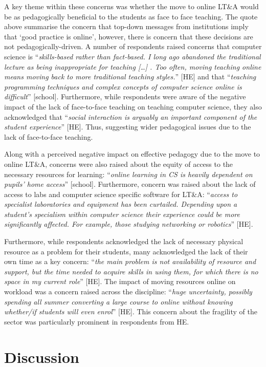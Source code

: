 \documentclass[sigconf]{acmart}
\begin{document}
A key theme within these concerns was whether the move to online LT\&A
would be as pedagogically beneficial to the students as face to face
teaching. The quote above summarise the concern that top-down messages
from institutions imply that `good practice is online', however, there
is concern that these decisions are not pedagogically-driven. A number
of respondents raised concerns that computer science is
``{\emph{skills-based rather than fact-based.  I long ago abandoned
the traditional lecture as being inappropriate for teaching […] .  Too
often, moving teaching online means moving back to more traditional
teaching styles.}}” [HE] and that ``{\emph{teaching programming
techniques and complex concepts of computer science online is
difficult}}'' [school]. Furthermore, while respondents were aware of
the negative impact of the lack of face-to-face teaching on teaching
computer science, they also acknowledged that ``{\emph{social
interaction is arguably an important component of the student
experience}}'' [HE]. Thus, suggesting wider pedagogical issues due to
the lack of face-to-face teaching.

Along with a perceived negative impact on effective pedagogy due to
the move to online LT\&A, concerns were also raised about the equity
of access to the necessary resources for learning: ``{\emph{online learning in
CS is heavily dependent on pupils' home access}}'' [school]. Furthermore,
concern was raised about the lack of access to labs and computer
science specific software for LT\&A: ``{\emph{access to specialist
laboratories and equipment has been curtailed. Depending upon a
student’s specialism within computer science their experience could be
more significantly affected. For example, those studying networking or
robotics}}'' [HE].

Furthermore, while respondents acknowledged the lack of necessary
physical resource as a problem for their students, many acknowledged
the lack of their own time as a key concern: ``{\emph{the main problem
is not availability of resource and support, but the time needed to
acquire skills in using them, for which there is no space in my
current role}}'' [HE]. The impact of moving resources online on
workload was a concern raised across the discipline: ``{\emph{huge
uncertainty, possibly spending all summer converting a large course to
online without knowing whether/if students will even enrol}}''
[HE]. This concern about the fragility of the sector was particularly
prominent in respondents from HE.

\section{Discussion}\label{discussion}
\end{document}
